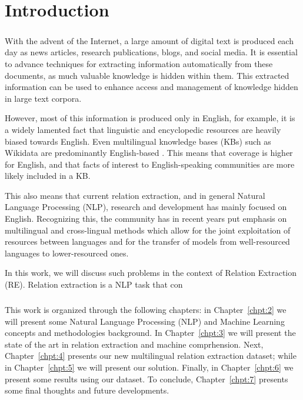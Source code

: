 \chapter{Introduction}
\paragraph{}

With the advent of the Internet, a large amount of digital text is produced each day as news articles, research publications, blogs, and social media. It is essential to advance techniques for extracting information automatically from these documents, as much valuable knowledge is hidden within them. This extracted information can be used to enhance access and management of knowledge hidden in large text corpora. 

However, most of this information is produced only in English, for example, it is a widely lamented fact that linguistic and encyclopedic resources are heavily biased towards English. Even multilingual knowledge bases (KBs) such as Wikidata \citep{vwikidata} are predominantly English-based \citep{Kaffee:Simperl:18}. This means that coverage is higher for English, and that facts of interest to English-speaking communities are more likely included in a KB.

This also means that current relation extraction, and in general Natural Language Processing (NLP), research and development has mainly focused on English. Recognizing this, the community has in recent years put emphasis on multilingual and cross-lingual methods which allow for the joint exploitation of resources between languages and for the transfer of models from well-resourced languages to lower-resourced ones.

In this work, we will discuss such problems in the context of Relation Extraction (RE). Relation extraction is a NLP task that con 



\paragraph{}
This work is organized through the following chapters: in Chapter~\ref{chpt:2} we will present some Natural Language Processing (NLP) and Machine Learning concepts and methodologies background. In Chapter~\ref{chpt:3} we will present the state of the art in relation extraction and machine comprhension. Next, Chapter~\ref{chpt:4} presents our new multilingual relation extraction dataset; while in Chapter~\ref{chpt:5} we will present our solution. Finally, in Chapter~\ref{chpt:6} we present some results using our dataset. To conclude, Chapter~\ref{chpt:7} presents some final thoughts and future developments.